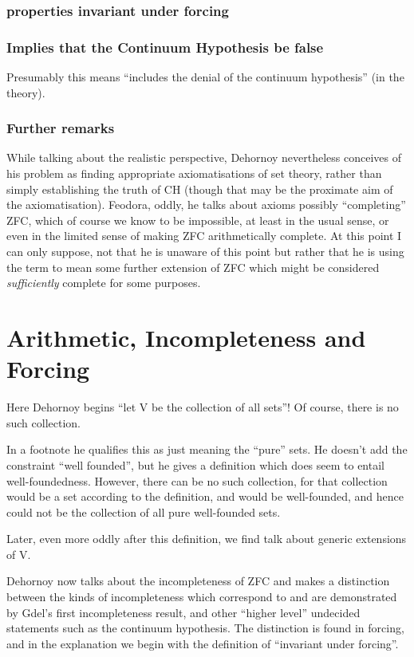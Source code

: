 \subsubsection{properties invariant under forcing}


\subsubsection{Implies that the Continuum Hypothesis be false}

Presumably this means ``includes the denial of the continuum hypothesis'' (in the theory).

\subsubsection{Further remarks}

While talking about the realistic perspective, Dehornoy nevertheless conceives of his problem as finding appropriate axiomatisations of set theory, rather than simply establishing the truth of CH (though that may be the proximate aim of the axiomatisation).
Feodora, oddly, he talks about axioms possibly ``completing'' ZFC, which of course we know to be impossible, at least in the usual sense, or even in the limited sense of making ZFC arithmetically complete.
At this point I can only suppose, not that he is unaware of this point but rather that he is using the term to mean some further extension of ZFC which might be considered \emph{sufficiently} complete for some purposes.

\section{Arithmetic, Incompleteness and Forcing}

Here Dehornoy begins ``let V be the collection of all sets''!
Of course, there is no such collection.

In a footnote he qualifies this as just meaning the ``pure'' sets.
He doesn't add the constraint ``well founded'', but he gives a definition which does seem to entail well-foundedness.
However, there can be no such collection, for that collection would be a set according to the definition, and would be well-founded, and hence could not be the collection of all pure well-founded sets.

Later, even more oddly after this definition, we find talk about generic extensions of V.

Dehornoy now talks about the incompleteness of ZFC and makes a distinction between the kinds of incompleteness which correspond to and are demonstrated by G{\ouml}del's first incompleteness result, and other ``higher level'' undecided statements such as the continuum hypothesis.
The distinction is found in forcing, and in the explanation we begin with the definition of ``invariant under forcing''.

